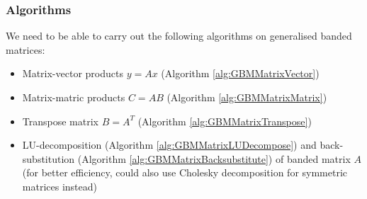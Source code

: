 \documentclass[10pt]{article}
\begin{document}
\subsubsection{Algorithms}
We need to be able to carry out the following algorithms on generalised banded matrices:
\begin{itemize}
  \item Matrix-vector products $y=Ax$ (Algorithm \ref{alg:GBMMatrixVector})
  \item Matrix-matric products $C=AB$ (Algorithm \ref{alg:GBMMatrixMatrix})
  \item Transpose matrix $B=A^T$ (Algorithm \ref{alg:GBMMatrixTranspose})
  \item LU-decomposition (Algorithm \ref{alg:GBMMatrixLUDecompose}) and back-substitution (Algorithm \ref{alg:GBMMatrixBacksubstitute}) of banded matrix $A$ (for better efficiency, could also use Cholesky decomposition for symmetric matrices instead)
\end{itemize}
\end{document}
